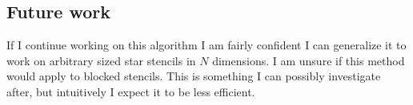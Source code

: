 \documentclass{article}
\begin{document}
\subsection*{Future work}
If I continue working on this algorithm I am fairly confident I can generalize it to work on arbitrary sized star stencils in $N$ dimensions. 
I am unsure if this method would apply to blocked stencils. This is something I can possibly investigate after, but intuitively I expect it to be less efficient. 

 
\end{document}
